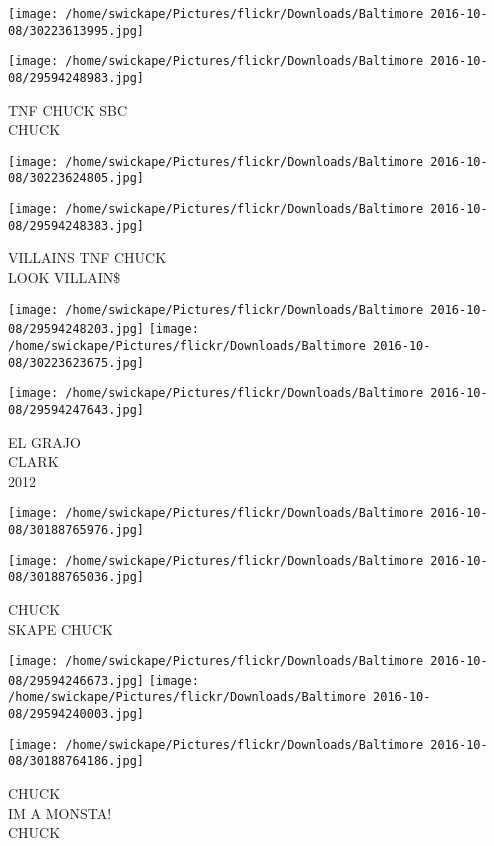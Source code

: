 \documentclass[10pt,letterpaper]{article}
\begin{document}
\texttt{[image: /home/swickape/Pictures/flickr/Downloads/Baltimore 2016-10-08/30223613995.jpg]}

\vspace{0.25in}
\texttt{[image: /home/swickape/Pictures/flickr/Downloads/Baltimore 2016-10-08/29594248983.jpg]}

TNF CHUCK SBC\\
CHUCK
\pagebreak

\texttt{[image: /home/swickape/Pictures/flickr/Downloads/Baltimore 2016-10-08/30223624805.jpg]}

\vspace{0.25in}
\texttt{[image: /home/swickape/Pictures/flickr/Downloads/Baltimore 2016-10-08/29594248383.jpg]}

VILLAINS TNF CHUCK\\
LOOK VILLAIN\$
\pagebreak

\texttt{[image: /home/swickape/Pictures/flickr/Downloads/Baltimore 2016-10-08/29594248203.jpg]}
\texttt{[image: /home/swickape/Pictures/flickr/Downloads/Baltimore 2016-10-08/30223623675.jpg]}

\vspace{0.25in}
\texttt{[image: /home/swickape/Pictures/flickr/Downloads/Baltimore 2016-10-08/29594247643.jpg]}

EL GRAJO\\
CLARK\\
2012
\pagebreak

\texttt{[image: /home/swickape/Pictures/flickr/Downloads/Baltimore 2016-10-08/30188765976.jpg]}

\vspace{0.25in}
\texttt{[image: /home/swickape/Pictures/flickr/Downloads/Baltimore 2016-10-08/30188765036.jpg]}

CHUCK\\
SKAPE CHUCK
\pagebreak

\texttt{[image: /home/swickape/Pictures/flickr/Downloads/Baltimore 2016-10-08/29594246673.jpg]}
\texttt{[image: /home/swickape/Pictures/flickr/Downloads/Baltimore 2016-10-08/29594240003.jpg]}

\vspace{0.25in}
\texttt{[image: /home/swickape/Pictures/flickr/Downloads/Baltimore 2016-10-08/30188764186.jpg]}

CHUCK\\
IM A MONSTA!\\
CHUCK
\pagebreak
\end{document}

